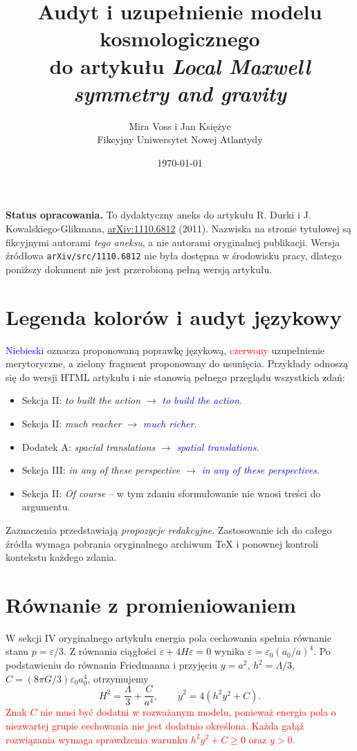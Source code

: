 \documentclass[11pt,a4paper]{article}
\title{Audyt i uzupełnienie modelu kosmologicznego\\
\large do artykułu \emph{Local Maxwell symmetry and gravity}}
\author{Mira Voss i Jan Księżyc\\
\small Fikcyjny Uniwersytet Nowej Atlantydy}
\date{\today}
\newcommand{\lang}[1]{\textcolor{blue}{#1}}
\newcommand{\substantive}[1]{\textcolor{red}{#1}}
\newcommand{\remove}[1]{\textcolor{green!50!black}{#1}}
\begin{document}
\maketitle
\noindent\textbf{Status opracowania.} To dydaktyczny aneks do
artykułu R. Durki i J. Kowalskiego-Glikmana,
\href{https://arxiv.org/abs/1110.6812}{arXiv:1110.6812} (2011).
Nazwiska na stronie tytułowej są fikcyjnymi autorami \emph{tego aneksu},
a nie autorami oryginalnej publikacji. Wersja źródłowa
\texttt{arXiv/src/1110.6812} nie była dostępna w środowisku pracy,
dlatego poniższy dokument nie jest przerobioną pełną wersją artykułu.

\section{Legenda kolorów i audyt językowy}
\noindent\lang{Niebieski} oznacza proponowaną poprawkę językową,
\substantive{czerwony} uzupełnienie merytoryczne, a
\remove{zielony} fragment proponowany do usunięcia.
Przykłady odnoszą się do wersji HTML artykułu i nie stanowią
pełnego przeglądu wszystkich zdań:
\begin{itemize}
  \item Sekcja II: \emph{to built the action} $\to$
    \lang{\emph{to build the action}}.
  \item Sekcja II: \emph{much reacher} $\to$
    \lang{\emph{much richer}}.
  \item Dodatek A: \emph{spacial translations} $\to$
    \lang{\emph{spatial translations}}.
  \item Sekcja III: \emph{in any of these perspective} $\to$
    \lang{\emph{in any of these perspectives}}.
  \item Sekcja II: \remove{\emph{Of course}} -- w tym zdaniu
    sformułowanie nie wnosi treści do argumentu.
\end{itemize}
Zaznaczenia przedstawiają \emph{propozycje redakcyjne}.
Zastosowanie ich do całego źródła wymaga pobrania oryginalnego
archiwum TeX i ponownej kontroli kontekstu każdego zdania.

\section{Równanie z promieniowaniem}
W sekcji IV oryginalnego artykułu energia pola cechowania
spełnia równanie stanu $p=\varepsilon/3$.
Z równania ciągłości $\dot\varepsilon+4H\varepsilon=0$ wynika
$\varepsilon=\varepsilon_0(a_0/a)^4$. Po podstawieniu do
równania Friedmanna i przyjęciu $y=a^2$, $h^2=\Lambda/3$,
$C=(8\pi G/3)\varepsilon_0a_0^4$, otrzymujemy
\begin{equation}
  H^2=\frac{\Lambda}{3}+\frac{C}{a^4},
  \qquad
  \dot y^2=4(h^2y^2+C).
  \label{eq:y}
\end{equation}
\substantive{Znak $C$ nie musi być dodatni w rozważanym modelu,
ponieważ energia pola o niezwartej grupie cechowania nie jest
dodatnio określona. Każda gałąź rozwiązania wymaga sprawdzenia
warunku $h^2y^2+C\geq0$ oraz $y>0$.}
\end{document}
